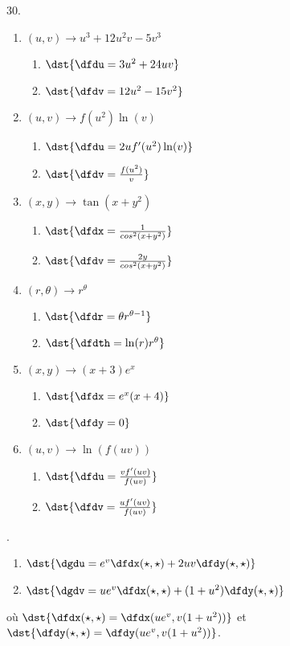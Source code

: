 30.
\begin{enumerate}
\item $(u,v)\rightarrow  u^3+12u^2v-5v^3$\\
\begin{enumerate}
\item $\dst{\dfdu = 3u^2+24uv}$
\item $\dst{\dfdv = 12u^2-15v^2}$
\end{enumerate}
\item $(u,v)\rightarrow  f(u^2)\ln(v)$\\
\begin{enumerate}
\item $\dst{\dfdu = 2uf'(u^2)\ln(v)}$
\item $\dst{\dfdv = \frac{f(u^2)}{v}}$
\end{enumerate}
\item $(x,y)\rightarrow \tan(x+y^2)$\\
\begin{enumerate}
\item $\dst{\dfdx =\frac{1}{cos^2(x+y^2)}}$
\item $\dst{\dfdv = \frac{2y}{cos^2(x+y^2)}}$
\end{enumerate}
\item $(r,\theta)\rightarrow  r^\theta$
\begin{enumerate}
\item $\dst{\dfdr =\theta r^{\theta-1}}$
\item $\dst{\dfdth =\ln(r)r^\theta}$
\end{enumerate}
\item $(x,y)\rightarrow (x+3)e^x$
\begin{enumerate}
\item $\dst{\dfdx =e^x(x+4)}$
\item $\dst{\dfdy =0}$
\end{enumerate}
\item $(u,v)\rightarrow  \ln(f(uv)) $\\

\begin{enumerate}
\item $\dst{\dfdu = \frac{vf'(uv)}{f(uv)}}$
\item $\dst{\dfdv = \frac{uf'(uv)}{f(uv)}}$
\end{enumerate}\pagebreak
\end{enumerate}

.
\begin{enumerate}
\item $\dst{\dgdu = e^v\dfdx(\star,\star)+2uv\dfdy(\star,\star)}$
\item $\dst{\dgdv = ue^v\dfdx(\star,\star)+(1+u^2)\dfdy(\star,\star)}$
\end{enumerate}
o\`{u} $\dst{\dfdx(\star,\star) = \dfdx(ue^v,v(1+u^2))}$ et $\dst{\dfdy(\star,\star) = \dfdy(ue^v,v(1+u^2))}$.

